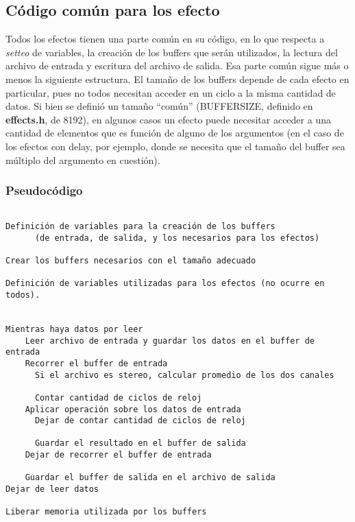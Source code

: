 \subsection{Código común para los efecto}
\label{subsec:desarrollo-comun}

Todos los efectos tienen una parte común en su código, en lo que respecta a \textit{setteo} de variables, la creación de los buffers que serán utilizados, la lectura del archivo de entrada y escritura del archivo de salida. Esa parte común sigue más o menos la siguiente estructura.\vspace{\baselineskip}
El tamaño de los buffers depende de cada efecto en particular, pues no todos necesitan acceder en un ciclo a la misma cantidad de datos. Si bien se definió un tamaño ``común'' (BUFFERSIZE, definido en \textbf{effects.h}, de 8192), en algunos casos un efecto puede necesitar acceder a una cantidad de elementos que es función de alguno de los argumentos (en el caso de los efectos con delay, por ejemplo, donde se necesita que el tamaño del buffer sea múltiplo del argumento en cuestión).

\subsubsection{Pseudocódigo}

        
\begin{lstlisting}[frame=single]

Definición de variables para la creación de los buffers
	  (de entrada, de salida, y los necesarios para los efectos)

Crear los buffers necesarios con el tamaño adecuado

Definición de variables utilizadas para los efectos (no ocurre en todos).


Mientras haya datos por leer
    Leer archivo de entrada y guardar los datos en el buffer de entrada
    Recorrer el buffer de entrada
      Si el archivo es stereo, calcular promedio de los dos canales
    
      Contar cantidad de ciclos de reloj
	Aplicar operación sobre los datos de entrada
      Dejar de contar cantidad de ciclos de reloj
    
      Guardar el resultado en el buffer de salida
    Dejar de recorrer el buffer de entrada
    
    Guardar el buffer de salida en el archivo de salida
Dejar de leer datos

Liberar memoria utilizada por los buffers
\end{lstlisting}
